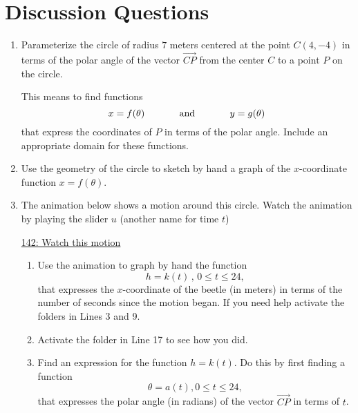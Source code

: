 \documentclass{ximera}
\begin{document}
\section{Discussion Questions}
\begin{question} \label{QLDfFFdRE}

\begin{enumerate}

\item Parameterize the circle of radius $7$ meters centered at the point $C(4,-4)$ in terms of the polar angle of the vector $\overrightarrow{CP}$ from the center $C$ to a point $P$ on the circle.

This means to find functions
\[
    x = f(\theta) \hskip 0.5 in \text{and} \hskip 0.5 in y=g(\theta)
\]
that express the coordinates of $P$ in terms of the polar angle. Include an appropriate domain for these functions.

\item Use the geometry of the circle to sketch by hand a graph of the $x$-coordinate function $x=f(\theta)$.

\item The animation below shows a motion around this circle. Watch the animation by playing the slider $u$ (another name for time $t$)

\begin{onlineOnly}
    \begin{center}
\end{center}
\end{onlineOnly}

\href{https://www.desmos.com/calculator/esr4pacqae}{142: Watch this motion}

\begin{enumerate}
\item Use the animation to graph by hand the function
\[
  h = k(t) \, , \, 0\leq t \leq 24,
\]
that expresses the $x$-coordinate of the beetle (in meters) in terms of the number of seconds since the motion began. If you need help activate the folders in Lines 3 and 9.

\item Activate the folder in Line 17 to see how you did.

\item Find an expression for the function $h=k(t)$. Do this by first finding a function 
\[
 \theta = a(t), 0\leq t \leq 24, 
\]
that expresses the polar angle (in radians) of the vector $\overrightarrow{CP}$ in terms of $t$.



\end{enumerate}
\end{enumerate}


\end{question} 
\end{document}
